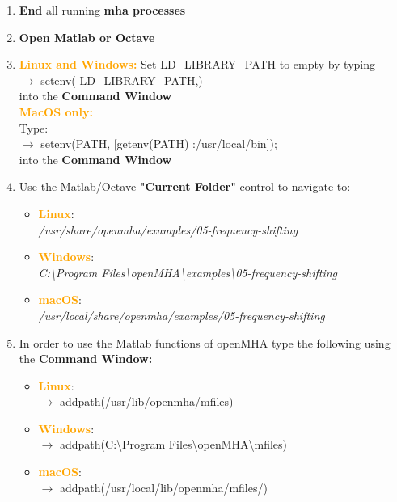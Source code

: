 \documentclass[11pt,a4paper,twoside]{article}
\newcommand{\+}{\discretionary{\mbox{\scriptsize$\hookleftarrow$}}{}{}}
\begin{document}
{{\begin{enumerate}
\item \textbf{End} all running \textbf{mha processes} 
\item \textbf{Open Matlab or Octave} 
\item \textcolor{orange}{\textbf{Linux and Windows:}} Set LD\_LIBRARY\_PATH to empty by typing \\ {\ttfamily
  $\rightarrow$ setenv(\textquotesingle
  LD\_LIBRARY\_PATH\textquotesingle,\textquotesingle\textquotesingle)} \\
  into the \textbf{Command Window} \\
\textcolor{orange}{\textbf{MacOS only:}} \\Type: \\{\ttfamily $\rightarrow$ setenv(\textquotesingle PATH\textquotesingle, [getenv(\textquotesingle PATH\textquotesingle) \textquotesingle :/usr/local/bin\textquotesingle]);} \\
into the \textbf{Command Window} \\  
\item Use the Matlab/Octave \textbf{"Current Folder"} control to navigate to:

\begin{itemize}
\item \textcolor{orange}{\textbf{Linux}}: \\
  \textit{/usr/share/openmha/examples/05-frequency-shifting}
\item \textcolor{orange}{\textbf{Windows}}: \\
  \textit{C:\textbackslash Program Files\textbackslash openMHA\textbackslash examples\textbackslash 05-frequency-shifting}
\item \textcolor{orange}{\textbf{macOS}}: \\
  \textit{/usr/local/share/openmha/examples/05-frequency-shifting}
\end{itemize}

\item In order to use the Matlab functions of openMHA type the following using the \textbf{Command Window:} 

\begin{itemize}
\item \textcolor{orange}{\textbf{Linux}}: \\ $\rightarrow$
  {\ttfamily addpath(\textquotesingle{}/usr/lib/openmha/mfiles\textquotesingle{})}
\item \textcolor{orange}{\textbf{Windows}}: \\ $\rightarrow$
  {\ttfamily addpath(\textquotesingle{}C:\textbackslash Program Files\textbackslash openMHA\textbackslash mfiles\textquotesingle{})}
\item \textcolor{orange}{\textbf{macOS}}: \\ $\rightarrow$
  {\ttfamily addpath(\textquotesingle{}/usr/local/lib/openmha/mfiles/\textquotesingle{})}
\end{itemize}



\end{enumerate}}}
\end{document}

